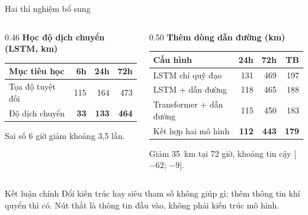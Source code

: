 \documentclass[aspectratio=169, 11pt, xcolor={table}]{beamer}
\begin{document}
\begin{frame}{Hai thí nghiệm bổ sung}
  \begin{columns}[T]
    \begin{column}{0.46\textwidth}
      \textbf{Học độ dịch chuyển (LSTM, km)}\\[2pt]
      \small
      \begin{tabular}{lrrr}
        \toprule
        \textbf{Mục tiêu học} & \textbf{6h} & \textbf{24h} & \textbf{72h} \\
        \midrule
        Tọa độ tuyệt đối & 115 & 164 & 473 \\
        Độ dịch chuyển   & \textbf{33} & \textbf{133} & \textbf{464} \\
        \bottomrule
      \end{tabular}

      \vspace{0.4em}
      \normalsize
      Sai số 6 giờ giảm khoảng 3,5 lần.
    \end{column}
    \begin{column}{0.50\textwidth}
      \textbf{Thêm dòng dẫn đường (km)}\\[2pt]
      \small
      \begin{tabular}{lrrr}
        \toprule
        \textbf{Cấu hình} & \textbf{24h} & \textbf{72h} & \textbf{TB} \\
        \midrule
        LSTM chỉ quỹ đạo        & 131 & 469 & 197 \\
        LSTM + dẫn đường        & 118 & 465 & 188 \\
        Transformer + dẫn đường & 115 & 450 & 183 \\
        Kết hợp hai mô hình     & \textbf{112} & \textbf{443} & \textbf{179} \\
        \bottomrule
      \end{tabular}

      \vspace{0.4em}
      \normalsize
      Giảm 35~km tại 72 giờ, khoảng tin cậy [$-62$; $-9$].
    \end{column}
  \end{columns}
  \vspace{0.15em}
  \begin{block}{Kết luận chính}
    Đổi kiến trúc hay siêu tham số không giúp gì; thêm thông tin khí quyển thì
    có. \alert{Nút thắt là thông tin đầu vào, không phải kiến trúc mô hình.}
  \end{block}
\end{frame}
\end{document}
